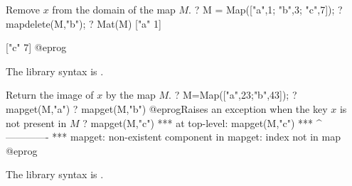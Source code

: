 \label{se:mapdelete}
Remove $x$ from the domain of the map $M$.
\bprog
? M = Map(["a",1; "b",3; "c",7]);
? mapdelete(M,"b");
? Mat(M)
["a" 1]

["c" 7]
@eprog

The library syntax is .

\label{se:mapget}
Return the image of $x$ by the map $M$.
\bprog
? M=Map(["a",23;"b",43]);
? mapget(M,"a")
? mapget(M,"b")
@eprog\noindent Raises an exception when the key $x$ is not present in $M$
\bprog
? mapget(M,"c")
  ***   at top-level: mapget(M,"c")
  ***                 ^-------------
  *** mapget: non-existent component in mapget: index not in map
@eprog

The library syntax is .

